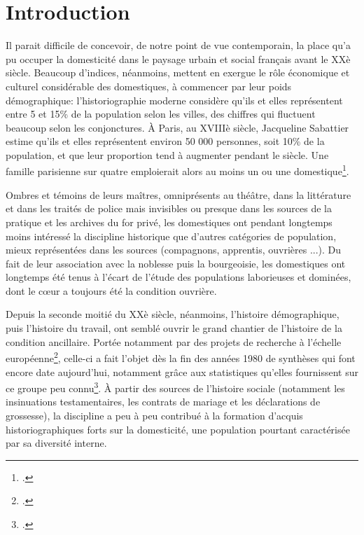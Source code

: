 \part*{Introduction}


Il parait difficile de concevoir, de notre point de vue contemporain, la place qu'a pu occuper la domesticité dans le paysage urbain et social français avant le XXè siècle. Beaucoup d'indices, néanmoins, mettent en exergue le rôle économique et culturel considérable des domestiques, à commencer par leur poids démographique: l'historiographie moderne considère qu'ils et elles représentent entre 5 et 15\% de la population selon les villes, des chiffres qui fluctuent beaucoup selon les conjonctures. À Paris, au XVIIIè siècle, Jacqueline Sabattier estime qu'ils et elles représentent environ 50 000 personnes, soit 10\% de la population, et que leur proportion tend à augmenter pendant le siècle. Une famille parisienne sur quatre emploierait alors au moins un ou une domestique\footcites[p.28]{mazaServantsMastersEighteenthcentury1983}.

Ombres et témoins de leurs maîtres, omniprésents au théâtre, dans la littérature et dans les traités de police mais invisibles ou presque dans les sources de la pratique et les archives du for privé, les domestiques ont pendant longtemps moins intéressé la discipline historique que d'autres catégories de population, mieux représentées dans les sources (compagnons, apprentis, ouvrières ...). Du fait de leur association avec la noblesse puis la bourgeoisie, les domestiques ont longtemps été tenus à l'écart de l'étude des populations laborieuses et dominées, dont le cœur a toujours été la condition ouvrière. 

Depuis la seconde moitié du XXè siècle, néanmoins, l'histoire démographique, puis l'histoire du travail, ont semblé ouvrir le grand chantier de l'histoire de la condition ancillaire. Portée notamment par des projets de recherche à l'échelle européenne\footcites{pasleauProceedingsServantProject2001}, celle-ci a fait l'objet dès la fin des années 1980 de synthèses qui font encore date aujourd'hui, notamment grâce aux statistiques qu'elles fournissent sur ce groupe peu connu\footcites{sabattierFigaroSonMaitre1984,guttonDomestiquesServiteursDans1981,fairchildsDomesticEnemiesServants1984, mazaServantsMastersEighteenthcentury1983}. À partir des sources de l'histoire sociale (notamment les insinuations testamentaires, les contrats de mariage et les déclarations de grossesse), la discipline a peu à peu contribué à la formation d'acquis historiographiques forts sur la domesticité, une population pourtant caractérisée par sa diversité interne. 

